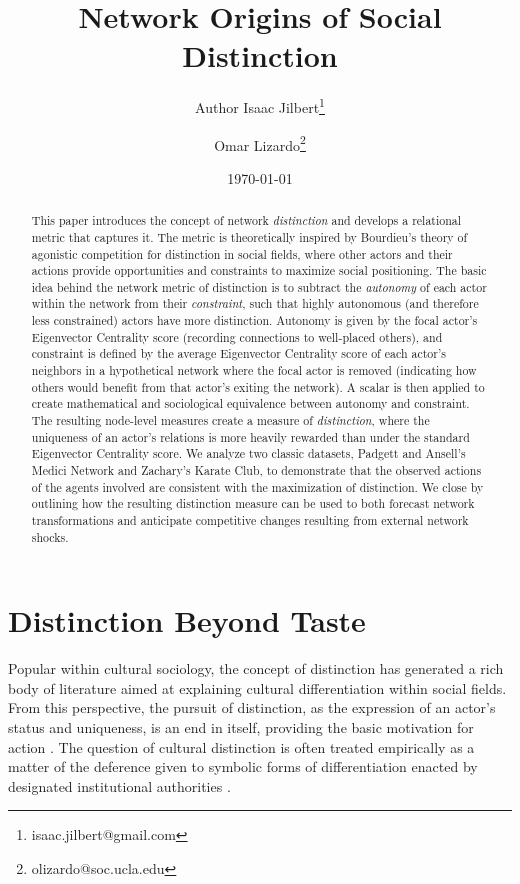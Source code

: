 \documentclass[12pt]{article}
\begin{document}
\title{Network Origins of Social Distinction}
\author[1]{Author Isaac Jilbert\thanks{isaac.jilbert@gmail.com}}
\author[1]{Omar Lizardo\thanks{olizardo@soc.ucla.edu}}

\renewcommand\Authands{ and }

\date{\normalsize \today}	
\maketitle

\newpage
\begin{abstract}	
This paper introduces the concept of network \textit{distinction} and develops a relational metric that captures it. The metric is theoretically inspired by Bourdieu's theory of agonistic competition for distinction in social fields, where other actors and their actions provide opportunities and constraints to maximize social positioning. The basic idea behind the network metric of distinction is to subtract the \textit{autonomy} of each actor within the network from their \textit{constraint}, such that highly autonomous (and therefore less constrained) actors have more distinction. Autonomy is given by the focal actor's Eigenvector Centrality score (recording connections to well-placed others), and constraint is defined by the average Eigenvector Centrality score of each actor's neighbors in a hypothetical network where the focal actor is removed (indicating how others would benefit from that actor's exiting the network). A scalar is then applied to create mathematical and sociological equivalence between autonomy and constraint. The resulting node-level measures create a measure of \textit{distinction}, where the uniqueness of an actor's relations is more heavily rewarded than under the standard Eigenvector Centrality score. We analyze two classic datasets, Padgett and Ansell's \citeyearpar{padgett1993robust} Medici Network and Zachary's \citeyearpar{zachary1977information} Karate Club, to demonstrate that the observed actions of the agents involved are consistent with the maximization of distinction. We close by outlining how the resulting distinction measure can be used to both forecast network transformations and anticipate competitive changes resulting from external network shocks.    
\end{abstract}

\newpage
\section{Distinction Beyond Taste}
Popular within cultural sociology, the concept of distinction has generated a rich body of literature aimed at explaining cultural differentiation within social fields. From this perspective, the pursuit of distinction, as the expression of an actor's status and uniqueness, is an end in itself, providing the basic motivation for action \citep{martin2003field}. The question of cultural distinction is often treated empirically as a matter of the deference given to symbolic forms of differentiation enacted by designated institutional authorities \citep{bourdieu1984distinction}. 
\end{document}
